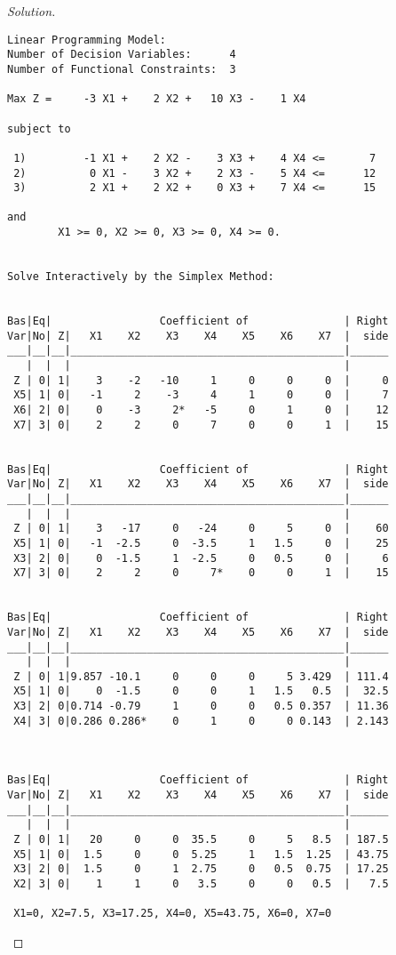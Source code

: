 \documentclass[titlepage, letterpaper, fleqn]{article}
\renewcommand\qedsymbol{\(\blacksquare\)}
\newenvironment{solution}
{\renewcommand\qedsymbol{$\square$}\begin{proof}[Solution]}
{\end{proof}}
\begin{document}
\begin{solution}
\begin{lstlisting}[basicstyle=\tiny]
Linear Programming Model:
Number of Decision Variables:      4
Number of Functional Constraints:  3

Max Z =     -3 X1 +    2 X2 +   10 X3 -    1 X4 

subject to

 1)         -1 X1 +    2 X2 -    3 X3 +    4 X4 <=       7
 2)          0 X1 -    3 X2 +    2 X3 -    5 X4 <=      12
 3)          2 X1 +    2 X2 +    0 X3 +    7 X4 <=      15

and
        X1 >= 0, X2 >= 0, X3 >= 0, X4 >= 0.


Solve Interactively by the Simplex Method:


Bas|Eq|                 Coefficient of               | Right
Var|No| Z|   X1    X2    X3    X4    X5    X6    X7  |  side
___|__|__|___________________________________________|______
   |  |  |                                           | 
 Z | 0| 1|    3    -2   -10     1     0     0     0  |     0
 X5| 1| 0|   -1     2    -3     4     1     0     0  |     7
 X6| 2| 0|    0    -3     2*   -5     0     1     0  |    12
 X7| 3| 0|    2     2     0     7     0     0     1  |    15


Bas|Eq|                 Coefficient of               | Right
Var|No| Z|   X1    X2    X3    X4    X5    X6    X7  |  side
___|__|__|___________________________________________|______
   |  |  |                                           | 
 Z | 0| 1|    3   -17     0   -24     0     5     0  |    60
 X5| 1| 0|   -1  -2.5     0  -3.5     1   1.5     0  |    25
 X3| 2| 0|    0  -1.5     1  -2.5     0   0.5     0  |     6
 X7| 3| 0|    2     2     0     7*    0     0     1  |    15


Bas|Eq|                 Coefficient of               | Right
Var|No| Z|   X1    X2    X3    X4    X5    X6    X7  |  side
___|__|__|___________________________________________|______
   |  |  |                                           | 
 Z | 0| 1|9.857 -10.1     0     0     0     5 3.429  | 111.4
 X5| 1| 0|    0  -1.5     0     0     1   1.5   0.5  |  32.5
 X3| 2| 0|0.714 -0.79     1     0     0   0.5 0.357  | 11.36
 X4| 3| 0|0.286 0.286*    0     1     0     0 0.143  | 2.143



Bas|Eq|                 Coefficient of               | Right
Var|No| Z|   X1    X2    X3    X4    X5    X6    X7  |  side
___|__|__|___________________________________________|______
   |  |  |                                           | 
 Z | 0| 1|   20     0     0  35.5     0     5   8.5  | 187.5
 X5| 1| 0|  1.5     0     0  5.25     1   1.5  1.25  | 43.75
 X3| 2| 0|  1.5     0     1  2.75     0   0.5  0.75  | 17.25
 X2| 3| 0|    1     1     0   3.5     0     0   0.5  |   7.5

 X1=0, X2=7.5, X3=17.25, X4=0, X5=43.75, X6=0, X7=0
\end{lstlisting}
\end{solution}
\end{document}
